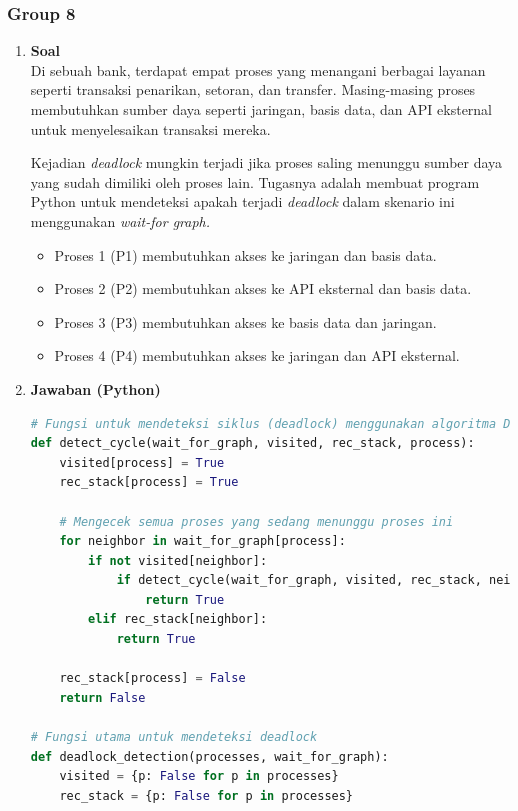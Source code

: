 \documentclass[12pt]{article}
\begin{document}
\subsubsection{Group 8}
\begin{enumerate}[label=\alph*.]
\item  \textbf{Soal} \\
Di sebuah bank, terdapat empat proses yang menangani berbagai layanan seperti transaksi penarikan, setoran, dan transfer. Masing-masing proses membutuhkan sumber daya seperti jaringan, basis data, dan API eksternal untuk menyelesaikan transaksi mereka.

Kejadian \textit{deadlock} mungkin terjadi jika proses saling menunggu sumber daya yang sudah dimiliki oleh proses lain. Tugasnya adalah membuat program Python untuk mendeteksi apakah terjadi \textit{deadlock} dalam skenario ini menggunakan \textit{wait-for graph.}

\begin{itemize}
    \item Proses 1 (P1) membutuhkan akses ke jaringan dan basis data.
    \item Proses 2 (P2) membutuhkan akses ke API eksternal dan basis data.
    \item Proses 3 (P3) membutuhkan akses ke basis data dan jaringan.
    \item Proses 4 (P4) membutuhkan akses ke jaringan dan API eksternal.
\end{itemize}


    \item \textbf{Jawaban (Python)}
\begin{lstlisting}[language=Python, caption=Deadlock Detection in Python, label=lst:pythoncode, frame=single, backgroundcolor=\color{lightgray}, basicstyle=\ttfamily\small, breaklines=true, xleftmargin=1em, xrightmargin=1em]
# Fungsi untuk mendeteksi siklus (deadlock) menggunakan algoritma DFS
def detect_cycle(wait_for_graph, visited, rec_stack, process):
    visited[process] = True
    rec_stack[process] = True

    # Mengecek semua proses yang sedang menunggu proses ini
    for neighbor in wait_for_graph[process]:
        if not visited[neighbor]:
            if detect_cycle(wait_for_graph, visited, rec_stack, neighbor):
                return True
        elif rec_stack[neighbor]:
            return True

    rec_stack[process] = False
    return False

# Fungsi utama untuk mendeteksi deadlock
def deadlock_detection(processes, wait_for_graph):
    visited = {p: False for p in processes}
    rec_stack = {p: False for p in processes}


\end{lstlisting}
\end{enumerate}
\end{document}
